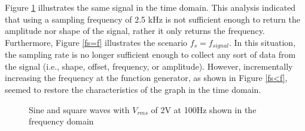 \documentclass[letterpaper,12pt]{article}
\begin{document}
Figure \ref{TimeDomainImages} illustrates the same signal in the time domain. This analysis indicated that using a sampling frequency of 2.5 kHz is not sufficient enough to return the amplitude nor shape of the signal, rather it only returns the frequency. Furthermore, Figure \ref{fs=f} illustrates the scenario $ f_s = f_{signal}$. In this situation, the sampling rate is no longer sufficient enough to collect any sort of data from the signal (i.e., shape, offset, frequency, or amplitude). However, incrementally increasing the frequency at the function generator, as shown in Figure \ref{fs<f}, seemed to restore the characteristics of the graph in the time domain. 

\begin{figure}[ht]
\centering
{}
\quad
{}
\quad
{}
\caption{Sine and square waves with $V_{rms}$ of 2V at 100Hz shown in the frequency domain}
\label{TimeDomainImages}
\end{figure}
\end{document}
